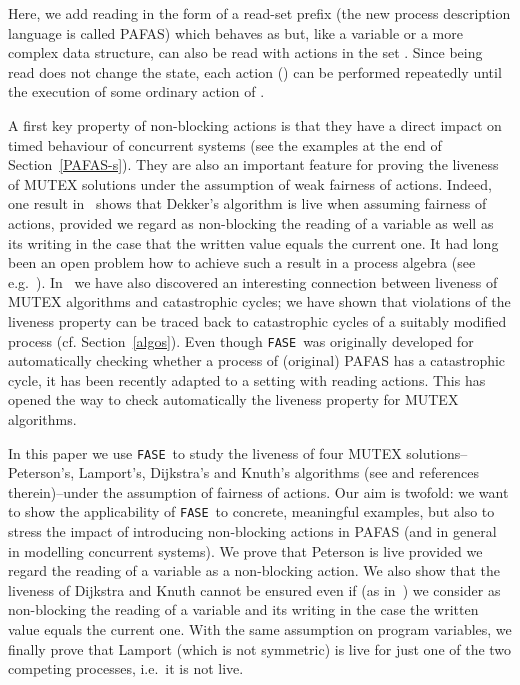 \documentclass[copyright,creativecommons]{eptcs}
\newcommand{\fase}{\texttt{FASE}}
\begin{document}
Here, we add reading in the form of a read-set prefix  (the new process description language is called PAFAS) which
behaves as  but, like a variable or a more complex data structure, can
also be read with actions in the set . Since being
read does not change the state, each action  () can be
performed repeatedly until the execution of some ordinary action of  .


A first key property of non-blocking actions is that they have a direct
impact on timed behaviour of concurrent systems (see the examples at the
end of Section~\ref{PAFAS-s}). They are also an important feature for
proving the liveness of MUTEX solutions under the assumption of weak
fairness of actions. Indeed, one result in~\cite{CDV08tr} shows that
Dekker's algorithm is live when assuming fairness of actions, provided we
regard as non-blocking the reading of a variable as well as its writing in
the case that the written value equals the current one. It had long been an
open problem how to achieve such a result in a process algebra (see
e.g.~\cite{Walker89}). In~\cite{CDV08tr} we have also discovered an
interesting connection between liveness of MUTEX algorithms and
catastrophic cycles; we have shown that violations of the liveness property
can be traced back to catastrophic cycles of a suitably modified process
(cf. Section~\ref{algos}). Even though \fase\ was originally developed for
automatically checking whether a process of (original) PAFAS has a
catastrophic cycle, it has been recently adapted to a setting with reading
actions. This has opened the way to check automatically the liveness
property for MUTEX algorithms.

In this paper we use \fase\ to study the liveness of four MUTEX
solutions--Peterson's, Lamport's, Dijkstra's and Knuth's algorithms (see
\cite{Walker89} and references therein)--under the assumption of
fairness of actions. Our aim is twofold: we want to show the applicability
of \fase\ to  concrete, meaningful examples, but also to stress the
impact of introducing non-blocking actions in PAFAS (and in general in
modelling concurrent systems). We prove that Peterson is live provided we
regard the reading of a variable as a non-blocking action. We also show
that the liveness of Dijkstra and Knuth cannot be ensured even if (as
in~\cite{CDV08tr}) we consider as non-blocking the reading of a variable
and its writing in the case the written value equals the current one. With
the same assumption on program variables, we finally prove that Lamport
(which is not symmetric) is live for just one of the two competing
processes, i.e.\ it is not live. 
\end{document}
